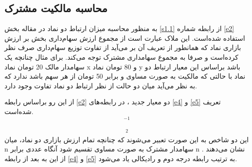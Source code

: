\documentclass[12pt]{article}
\begin{document}
{\begin{table}[htbp]
  \centering
      \caption{خلاصه آماری جفت‌های شناسایی شده  }
      \label{t1}
\end{table}}
 \color{black}
 \subsection{محاسبه مالکیت مشترک}
 به منظور محاسبه میزان ارتباط دو نماد در مقاله بخش 
 \ref{s1.1}
  از رابطه  شماره 
 \ref{e2}
 استفاده‌ شده‌است. این ملاک عبارت است  از مجموع ارزش سهام‌داری بخش بر ارزش بازاری نماد که همانطور از تعریف آن بر می‌آید از تفاوت توزیع سهام‌داری صرف نظر کرده‌است و صرفا به مجموع سهامداری مشترک توجه می‌کند. برای مثال چنانچه یک سهامدار مالک 20 تومان نماد x و 80 تومان نماد y باشد براساس این معیار ارتباط دو نماد با حالتی که مالکیت به صورت مساوی و برابر 50 تومان از هر سهم باشد ندارد که به نظر می‌آید میان دو حالت از نظر ارتباط دو نماد تفاوت وجود دارد.

  از این رو براساس رابطه
    \ref{e2}
     دو معیار جدید 
 ، در رابطه‌های 
   \ref{e4}
   و
     \ref{e5}
  تعریف شده‌است.
    \begin{equation}
    [{\frac{\sum_{f = 1}^{F} [(S^f_{i,t}P_{i,t})^2+(S^f_{j,t}P_{j,t})^2]}{(S_{i,t}P{i,t})^2 + (S_{j,t}P{j,t})^2}}]^{-1}
    \label{e4}
    \end{equation}
    
    \begin{equation}
    [\frac{\sum_{f = 1}^{F} (\sqrt{S^f_{i,t}P_{i,t}}+\sqrt{S^f_{j,t}P_{j,t}})}{\sqrt{S_{i,t}P{i,t}} + \sqrt{S_{j,t}P{j,t}}}]^2
      \label{e5}
    \end{equation}
 این دو شاخص به این صورت تعبیر می‌شوند که چنانچه تمام ارزش بازاری دو نماد، میان n سهامدار مشترک به صورت مساوی تقسیم شود آنگاه عددی برابر n نشان می‌دهند
.
از این به بعد از رابطه 
  \ref{e4} 
  و
  \ref{e5}
  به ترتیب رابطه درجه دوم
  و رادیکالی 
    یاد می‌شود.
    
\end{document}
